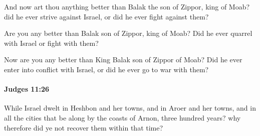 			\begin{versebox}
					\item[BHS] 
					\item[ASV] And now art thou anything better than Balak the son of Zippor, king of Moab? did he ever strive against Israel, or did he ever fight against them?
					\item[NIV] Are you any better than Balak son of Zippor, king of Moab? Did he ever quarrel with Israel or fight with them?
					\item[NRSV] Now are you any better than King Balak son of Zippor of Moab? Did he ever enter into conflict with Israel, or did he ever go to war with them?
			\end{versebox}

		\paragraph{Judges 11:26} %
			\label{JUDGES-11-26}

			While Israel dwelt in Heshbon and her towns, and in Aroer and her towns, and in all the cities that be along by the coasts of Arnon, three hundred years? why therefore did ye not recover them within that time?

